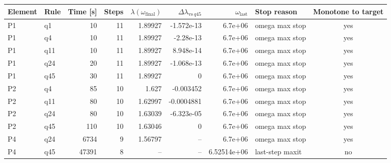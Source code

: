\begin{tabularx}{\textwidth}{@{}llrrrrrXc@{}}
\toprule
Element & Rule & Time [s] & Steps & $\lambda(\omega_{\mathrm{final}})$ & $\Delta\lambda_{\mathrm{vs}\ q45}$ & $\omega_{\mathrm{last}}$ & Stop reason & Monotone to target \\
\midrule
P1 & q1 & 10 & 11 & 1.89927 & -1.572e-13 & 6.7e+06 & omega max stop & yes \\
P1 & q4 & 10 & 11 & 1.89927 & -2.28e-13 & 6.7e+06 & omega max stop & yes \\
P1 & q11 & 10 & 11 & 1.89927 & 8.948e-14 & 6.7e+06 & omega max stop & yes \\
P1 & q24 & 20 & 11 & 1.89927 & -1.068e-13 & 6.7e+06 & omega max stop & yes \\
P1 & q45 & 30 & 11 & 1.89927 & 0 & 6.7e+06 & omega max stop & yes \\
P2 & q4 & 85 & 10 & 1.627 & -0.003452 & 6.7e+06 & omega max stop & yes \\
P2 & q11 & 80 & 10 & 1.62997 & -0.0004881 & 6.7e+06 & omega max stop & yes \\
P2 & q24 & 80 & 10 & 1.63039 & -6.323e-05 & 6.7e+06 & omega max stop & yes \\
P2 & q45 & 110 & 10 & 1.63046 & 0 & 6.7e+06 & omega max stop & yes \\
P4 & q24 & 6734 & 9 & 1.56797 & -- & 6.7e+06 & omega max stop & yes \\
P4 & q45 & 47391 & 8 & -- & -- & 6.52514e+06 & last-step maxit & no \\
\bottomrule
\end{tabularx}
